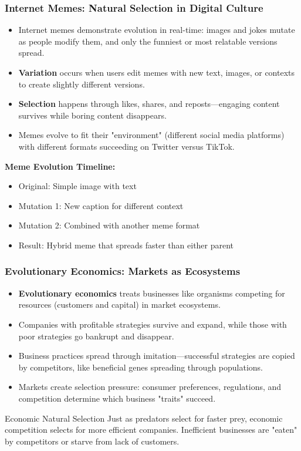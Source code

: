 \documentclass{beamer}
\begin{document}
	\begin{frame}
		\frametitle{Internet Memes: Natural Selection in Digital Culture}
		\begin{itemize}
			\item Internet memes demonstrate evolution in real-time: images and jokes mutate as people modify them, and only the funniest or most relatable versions spread.
			\item \textbf{Variation} occurs when users edit memes with new text, images, or contexts to create slightly different versions.
			\item \textbf{Selection} happens through likes, shares, and reposts—engaging content survives while boring content disappears.
			\item Memes evolve to fit their "environment" (different social media platforms) with different formats succeeding on Twitter versus TikTok.
		\end{itemize}
		\begin{example}
			\scriptsize
			\textbf{Meme Evolution Timeline:}
			\begin{itemize}
				\item Original: Simple image with text
				\item Mutation 1: New caption for different context
				\item Mutation 2: Combined with another meme format
				\item Result: Hybrid meme that spreads faster than either parent
			\end{itemize}
		\end{example}
	\end{frame}
	
	\begin{frame}
		\frametitle{Evolutionary Economics: Markets as Ecosystems}
		\begin{itemize}
			\item \textbf{Evolutionary economics} treats businesses like organisms competing for resources (customers and capital) in market ecosystems.
			\item Companies with profitable strategies survive and expand, while those with poor strategies go bankrupt and disappear.
			\item Business practices spread through imitation—successful strategies are copied by competitors, like beneficial genes spreading through populations.
			\item Markets create selection pressure: consumer preferences, regulations, and competition determine which business "traits" succeed.
		\end{itemize}
		\begin{block}{Economic Natural Selection}
			Just as predators select for faster prey, economic competition selects for more efficient companies. Inefficient businesses are "eaten" by competitors or starve from lack of customers.
		\end{block}
	\end{frame}
	
\end{document}
